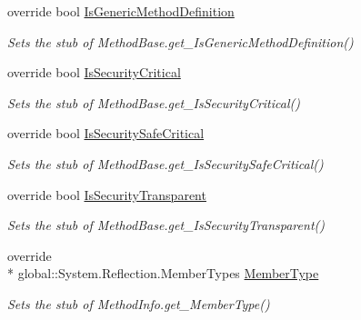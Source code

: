 \begin{DoxyCompactItemize}
override bool \hyperlink{class_system_1_1_reflection_1_1_fakes_1_1_stub_method_info_a0cd52b895bcf90665d5713bbc9eda360}{Is\-Generic\-Method\-Definition}
\begin{DoxyCompactList}\small\item\em Sets the stub of Method\-Base.\-get\-\_\-\-Is\-Generic\-Method\-Definition()\end{DoxyCompactList}\item 
override bool \hyperlink{class_system_1_1_reflection_1_1_fakes_1_1_stub_method_info_a1cea13ab768e5ca5f7a44dd0261cb526}{Is\-Security\-Critical}
\begin{DoxyCompactList}\small\item\em Sets the stub of Method\-Base.\-get\-\_\-\-Is\-Security\-Critical()\end{DoxyCompactList}\item 
override bool \hyperlink{class_system_1_1_reflection_1_1_fakes_1_1_stub_method_info_a19ece2fe9d4659c1ec52d116b36b50b1}{Is\-Security\-Safe\-Critical}
\begin{DoxyCompactList}\small\item\em Sets the stub of Method\-Base.\-get\-\_\-\-Is\-Security\-Safe\-Critical()\end{DoxyCompactList}\item 
override bool \hyperlink{class_system_1_1_reflection_1_1_fakes_1_1_stub_method_info_a72f80729eeeef2231e206327739ddc4a}{Is\-Security\-Transparent}
\begin{DoxyCompactList}\small\item\em Sets the stub of Method\-Base.\-get\-\_\-\-Is\-Security\-Transparent()\end{DoxyCompactList}\item 
override \\*
global\-::\-System.\-Reflection.\-Member\-Types \hyperlink{class_system_1_1_reflection_1_1_fakes_1_1_stub_method_info_a25f0653e7f0e665138ce574ef8d59f46}{Member\-Type}
\begin{DoxyCompactList}\small\item\em Sets the stub of Method\-Info.\-get\-\_\-\-Member\-Type()\end{DoxyCompactList}\item 

\end{DoxyCompactItemize}

